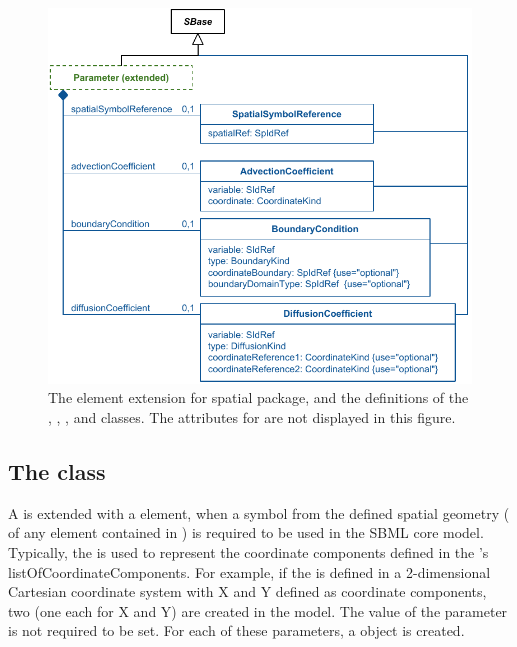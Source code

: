 \begin{figure}[ht]
  \includegraphics{figs/extended-parameter-uml}
  \caption{The \Parameter element extension for spatial package, and the definitions of the \SpatialSymbolReference, \AdvectionCoefficient, \BoundaryCondition, and \DiffusionCoefficient classes. The \sbmlthreecore attributes for \Parameter are not displayed in this figure.}
  \label{parameter-uml}
\end{figure}



\subsection{The  class}
\label{spatialsymbolreference-class}
A \Parameter is extended with a \SpatialSymbolReference element, when a symbol from the defined spatial geometry ( of any element contained in \Geometry) is required to be used in the SBML core model. Typically, the \SpatialSymbolReference is used to represent the coordinate components defined in the \Geometry's listOfCoordinateComponents.  For example, if the \Geometry is defined in a 2-dimensional Cartesian coordinate system with X and Y defined as coordinate components, two \Parameters (one each for \CoordinateComponents X and Y) are created in the model. The value of the parameter is not required to be set. For each of these parameters, a \SpatialSymbolReference object is created.

